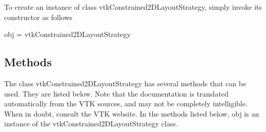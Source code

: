 To create an instance of class vtk\-Constrained2\-D\-Layout\-Strategy, simply invoke its constructor as follows \begin{DoxyVerb}  obj = vtkConstrained2DLayoutStrategy
\end{DoxyVerb}
 \hypertarget{vtkwidgets_vtkxyplotwidget_Methods}{}\subsection{Methods}\label{vtkwidgets_vtkxyplotwidget_Methods}
The class vtk\-Constrained2\-D\-Layout\-Strategy has several methods that can be used. They are listed below. Note that the documentation is translated automatically from the V\-T\-K sources, and may not be completely intelligible. When in doubt, consult the V\-T\-K website. In the methods listed below, {\ttfamily obj} is an instance of the vtk\-Constrained2\-D\-Layout\-Strategy class. 

